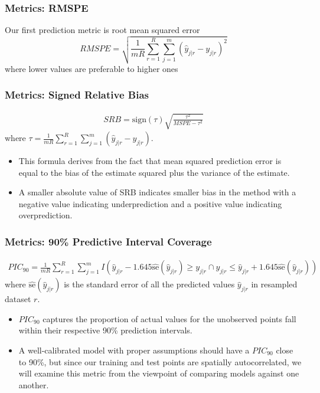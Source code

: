 \documentclass{beamer}
\begin{document}
\begin{frame}
	\frametitle{Metrics: RMSPE}
		Our first prediction metric is root mean squared error
		$$
		RMSPE = \sqrt{\frac{1}{mR} \sum_{r=1}^R \sum_{j=1}^m (\hat{y}_{j|r} - y_{j|r})^2}
		$$
		where lower values are preferable to higher ones
\end{frame}

\begin{frame}
	\frametitle{Metrics: Signed Relative Bias}
	\begin{align*}
	SRB = \text{sign}(\tau) \sqrt{\frac{\tau^2}{MSPE - \tau^2}}
	\end{align*}
	where $\tau = \frac{1}{mR} \sum_{r = 1}^R \sum_{j = 1}^m (\hat{y}_{j|r} - y_{j|r})$.
	\begin{itemize}
		\item This formula derives from the fact that mean squared prediction error is equal to the bias of the estimate squared plus the variance of the estimate.
		\item A smaller absolute value of SRB indicates smaller bias in the method with a negative value indicating underprediction and a positive value indicating overprediction.\cite{verhoef13}
	\end{itemize}
\end{frame}

\begin{frame}
	\frametitle{Metrics: 90\% Predictive Interval Coverage}
	\begin{align*}
	PIC_{90} = \frac{1}{mR} \sum_{r=1}^R \sum_{j=1}^m I\left(\hat{y}_{j|r} - 1.645\hat{\text{se}}(\hat{y}_{j|r}) \geq y_{j|r} \cap y_{j|r} \leq \hat{y}_{j|r} + 1.645\hat{\text{se}}(\hat{y}_{j|r})\right)
	\end{align*}
	where $\hat{\text{se}}(\hat{y}_{j|r})$ is the standard error of all the predicted values $\hat{y}_{j|r}$ in resampled dataset $r$.\cite{verhoef13}
	\begin{itemize}
		\item $PIC_{90}$ captures the proportion of actual values for the unobserved points fall within their respective 90\% prediction intervals.
		\item A well-calibrated model with proper assumptions should have a $PIC_{90}$ close to 90\%, but since our training and test points are spatially autocorrelated, we will examine this metric from the viewpoint of comparing models against one another. 
	\end{itemize}
\end{frame}
\end{document}
